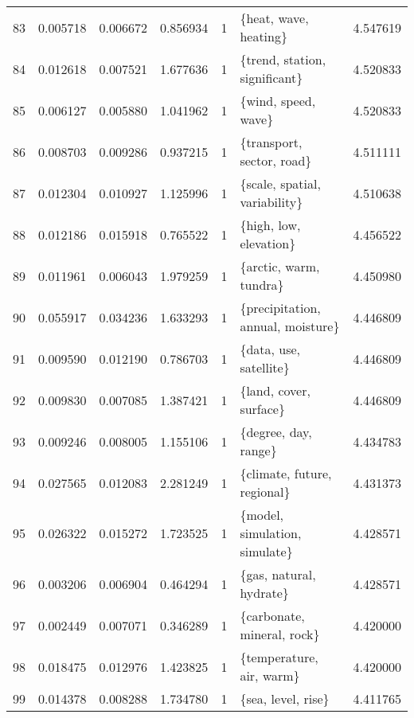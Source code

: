 \begin{tabular}{lrrrrlr}
83  &    0.005718 &  0.006672 &        0.856934 &           1 &                   \{heat, wave, heating\} &  4.547619 \\
84  &    0.012618 &  0.007521 &        1.677636 &           1 &           \{trend, station, significant\} &  4.520833 \\
85  &    0.006127 &  0.005880 &        1.041962 &           1 &                     \{wind, speed, wave\} &  4.520833 \\
86  &    0.008703 &  0.009286 &        0.937215 &           1 &               \{transport, sector, road\} &  4.511111 \\
87  &    0.012304 &  0.010927 &        1.125996 &           1 &           \{scale, spatial, variability\} &  4.510638 \\
88  &    0.012186 &  0.015918 &        0.765522 &           1 &                  \{high, low, elevation\} &  4.456522 \\
89  &    0.011961 &  0.006043 &        1.979259 &           1 &                  \{arctic, warm, tundra\} &  4.450980 \\
90  &    0.055917 &  0.034236 &        1.633293 &           1 &       \{precipitation, annual, moisture\} &  4.446809 \\
91  &    0.009590 &  0.012190 &        0.786703 &           1 &                  \{data, use, satellite\} &  4.446809 \\
92  &    0.009830 &  0.007085 &        1.387421 &           1 &                  \{land, cover, surface\} &  4.446809 \\
93  &    0.009246 &  0.008005 &        1.155106 &           1 &                    \{degree, day, range\} &  4.434783 \\
94  &    0.027565 &  0.012083 &        2.281249 &           1 &             \{climate, future, regional\} &  4.431373 \\
95  &    0.026322 &  0.015272 &        1.723525 &           1 &           \{model, simulation, simulate\} &  4.428571 \\
96  &    0.003206 &  0.006904 &        0.464294 &           1 &                 \{gas, natural, hydrate\} &  4.428571 \\
97  &    0.002449 &  0.007071 &        0.346289 &           1 &              \{carbonate, mineral, rock\} &  4.420000 \\
98  &    0.018475 &  0.012976 &        1.423825 &           1 &                \{temperature, air, warm\} &  4.420000 \\
99  &    0.014378 &  0.008288 &        1.734780 &           1 &                      \{sea, level, rise\} &  4.411765 \\

\end{tabular}
